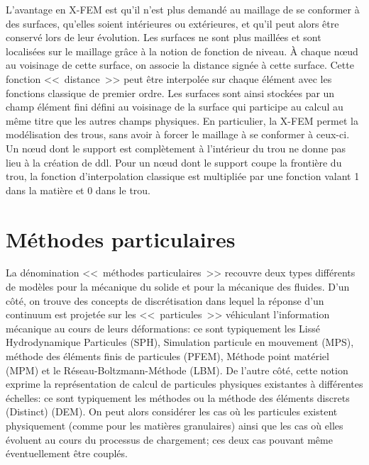 \medskip
L'avantage en X-FEM est qu'il n'est plus demandé au maillage de se conformer à des surfaces, qu'elles soient intérieures ou extérieures, et qu'il peut alors être conservé lors de leur évolution. Les surfaces ne sont plus maillées et sont localisées sur le maillage grâce à la notion de fonction de niveau. À chaque nœud au voisinage de cette surface, on associe la distance signée à cette surface. Cette fonction <<~distance~>> peut être interpolée sur chaque élément avec les fonctions classique de premier ordre. Les surfaces sont ainsi stockées par un champ élément fini défini au voisinage de la surface qui participe au calcul au même titre que les autres champs physiques. En particulier, la X-FEM permet la modélisation des trous, sans avoir à forcer le maillage à se conformer à ceux-ci. Un nœud dont le support est complètement à l'intérieur du trou ne donne pas lieu à la création de ddl. Pour un nœud dont le support coupe la frontière du trou, la fonction d'interpolation classique est multipliée par une fonction valant 1 dans la matière et 0 dans le trou.

\medskip
\section{Méthodes particulaires}\label{Sec-PBM}
La dénomination <<~méthodes particulaires~>> recouvre deux types différents de modèles pour la mécanique du solide et pour la mécanique des fluides. D'un côté, on trouve des concepts de discrétisation dans lequel la réponse d'un continuum est projetée sur les <<~particules~>> véhiculant l'information mécanique au cours de leurs déformations: ce sont typiquement les  Lissé Hydrodynamique Particules (SPH), Simulation particule en mouvement (MPS), méthode des éléments finis de particules (PFEM), Méthode point matériel (MPM) et le Réseau-Boltzmann-Méthode (LBM). De l'autre côté, cette notion exprime la représentation de calcul de particules physiques existantes à différentes échelles: ce sont typiquement les méthodes  ou la méthode des éléments discrets (Distinct) (DEM). On peut alors considérer les cas où les particules existent physiquement (comme pour les matières granulaires) ainsi que les cas où elles évoluent au cours du processus de chargement; ces deux cas pouvant même éventuellement être couplés.

